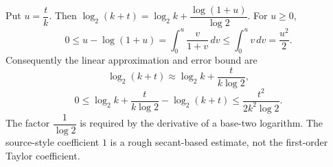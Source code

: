 Put $u=\dfrac{t}{k}$. Then $\log_2(k+t)=\log_2k+\dfrac{\log(1+u)}{\log2}$. For $u\ge0$,
\[
0\le u-\log(1+u)=\int_0^u\dfrac{v}{1+v}\,dv
\le\int_0^u v\,dv=\dfrac{u^2}{2}.
\]
Consequently the linear approximation and error bound are
\[
\boxed{\log_2(k+t)\approx\log_2k+\dfrac{t}{k\log2}},
\]
\[
0\le\log_2k+\dfrac{t}{k\log2}-\log_2(k+t)
\le\dfrac{t^2}{2k^2\log2}.
\]
The factor $\dfrac{1}{\log2}$ is required by the derivative of a base-two logarithm. The source-style coefficient $1$ is a rough secant-based estimate, not the first-order Taylor coefficient.
